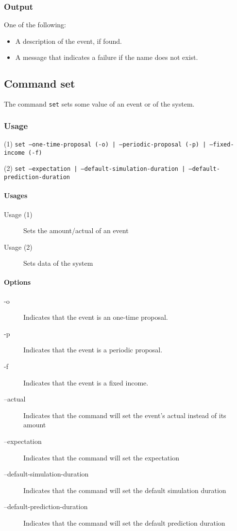 \subsubsection{Output}
One of the following:
\begin{itemize}
	\item A description of the event, if found.
	\item A message that indicates a failure if the name does not exist.
\end{itemize}

\subsection{Command set}
The command \texttt{set} sets some value of an event or of the system.
\subsubsection{Usage}
\begin{center}
	(1) \texttt{set --one-time-proposal (-o) | --periodic-proposal (-p) | --fixed-income (-f)}    
	
	(2) \texttt{set --expectation | --default-simulation-duration | --default-prediction-duration} 
\end{center}

\paragraph{Usages}
\begin{description}
	\item[Usage (1)] Sets the amount/actual of an event
	\item[Usage (2)] Sets data of the system
\end{description}

\paragraph{Options}
\begin{description}
	\item[-o] Indicates that the event is an one-time proposal.
	\item[-p] Indicates that the event is a periodic proposal.
	\item[-f] Indicates that the event is a fixed income.
	\item[--actual] Indicates that the command will set the event's actual instead of its amount
	\item[--expectation] Indicates that the command will set the expectation
	\item[--default-simulation-duration] Indicates that the command will set the default simulation duration
	\item[--default-prediction-duration] Indicates that the command will set the default prediction duration
\end{description}


